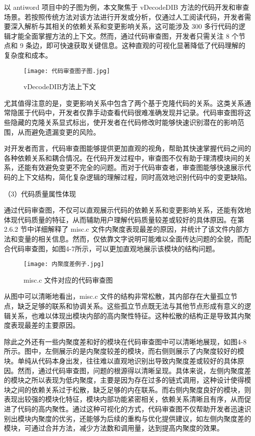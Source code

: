 以 antiword 项目中的子图为例，本文聚焦于 vDecodeDIB 方法的代码开发和审查场景。若按照传统方法对该方法进行开发或分析，仅通过人工阅读代码，开发者需要深入解析与其相关的依赖关系和变更影响关系，这可能涉及 300 多行代码的逻辑才能全面掌握方法的上下文。然而，通过代码审查图，开发者只需关注 8 个节点和 9 条边，即可快速获取关键信息。这种直观的可视化显著降低了代码理解的复杂度和成本。

\begin{figure}[h]
\centering
\texttt{[image: 代码审查图子图.jpg]}
\caption{vDecodeDIB方法上下文}
\end{figure}

尤其值得注意的是，变更影响关系中包含了两个基于克隆代码的关系。这类关系通常隐匿于代码中，开发者仅靠手动查看代码很难准确发现并记录。代码审查图将这些隐藏的克隆关系显式标出，使开发者在代码修改时能够快速识别潜在的影响范围，从而避免遗漏变更的风险。

对开发者而言，代码审查图能够提供更加直观的视角，帮助其快速掌握代码之间的各种依赖关系和耦合情况。在代码开发过程中，审查图不仅有助于理清模块间的关系，还能有效避免变更不完全的问题。而对于代码审查者，审查图能够快速展示代码的上下文结构，简化复杂逻辑的理解过程，同时高效地识别代码中的变更缺陷。

（3）代码质量属性体现

通过代码审查图，不仅可以直观展示代码的依赖关系和变更影响关系，还能有效地体现代码质量的特征，从而辅助用户理解代码质量较差或较好的具体原因。在第 2.6.2 节中详细解释了 misc.c 文件内聚度表现最差的原因，并统计了该文件内部方法和变量的相关信息。然而，仅依靠文字说明可能难以全面传达问题的全貌，而配合代码审查图，如图4-7所示，可以更加直观地展示该模块的结构问题。

\begin{figure}[h]
\centering
\texttt{[image: 内聚度差例子.jpg]}
\caption{misc.c 文件对应的代码审查图}
\end{figure}

从图中可以清晰地看出，misc.c 文件的结构非常松散，其内部存在大量孤立节点，缺乏足够的联系和协调关系。这些孤立节点既无法与其他节点形成有意义的逻辑关系，也难以体现出模块内部的高内聚性特征。这种松散的结构正是导致其内聚度表现最差的主要原因。

除此之外还有一些内聚度差和好的模块在代码审查图中可以清晰地展现，如图4-8所示。图中，左侧展示的是内聚度较差的模块，而右侧则展示了内聚度较好的模块。单纯从代码本身出发，往往难以直观地识别出导致内聚度差或较好的具体原因。然而，通过代码审查图，问题的根源得以清晰呈现。具体来说，左侧内聚度差的模块之所以表现为低内聚度，主要是因为存在过多的链式调用，这种设计使得模块之间的依赖关系过于松散，缺乏足够的内在联系。而右侧内聚度良好的模块，则表现出较强的模块化特征，模块内部功能紧密相关，依赖关系清晰且有序，从而促进了代码的高内聚性。通过这种可视化的方式，代码审查图不仅帮助开发者迅速识别出模块内聚度的优劣，还能够为后续的重构与优化提供建议，如左侧内聚度差的模块，可通过合并方法，减少方法数和调用量，达到提高内聚度的效果。

